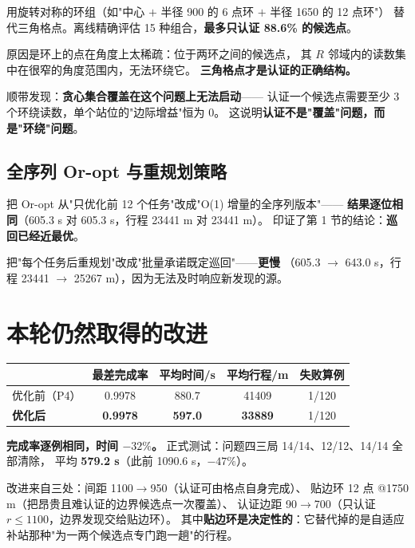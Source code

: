 用旋转对称的环组（如"中心 $+$ 半径 900 的 6 点环 $+$ 半径 1650 的 12 点环"）
替代三角格点。离线精确评估 15 种组合，\textbf{最多只认证 88.6\% 的候选点}。

原因是环上的点在角度上太稀疏：位于两环之间的候选点，
其 $R$ 邻域内的读数集中在很窄的角度范围内，无法环绕它。
\textbf{三角格点才是认证的正确结构。}

顺带发现：\textbf{贪心集合覆盖在这个问题上无法启动}——
认证一个候选点需要至少 3 个环绕读数，单个站位的"边际增益"恒为 0。
这说明\textbf{认证不是"覆盖"问题，而是"环绕"问题}。

\subsection{全序列 Or-opt 与重规划策略}

把 Or-opt 从"只优化前 12 个任务"改成"O(1) 增量的全序列版本"——
\textbf{结果逐位相同}（605.3 s 对 605.3 s，行程 23441 m 对 23441 m）。
印证了第 1 节的结论：\textbf{巡回已经近最优}。

把"每个任务后重规划"改成"批量承诺既定巡回"——\textbf{更慢}
（605.3 $\to$ 643.0 s，行程 23441 $\to$ 25267 m），因为无法及时响应新发现的源。

\section{本轮仍然取得的改进}

\begin{center}
\begin{tabular}{lcccc}
\toprule
 & 最差完成率 & 平均时间/s & 平均行程/m & 失败算例 \\ \midrule
优化前（P4） & 0.9978 & 880.7 & 41409 & 1/120 \\
\textbf{优化后} & \textbf{0.9978} & \textbf{597.0} & \textbf{33889} & 1/120 \\
\bottomrule
\end{tabular}
\end{center}

\textbf{完成率逐例相同，时间 $-32\%$。} 正式测试：问题四三局 14/14、12/12、14/14 全部清除，
平均 \textbf{579.2 s}（此前 1090.6 s，$-47\%$）。

改进来自三处：间距 1100$\to$950（认证可由格点自身完成）、
贴边环 12 点 @1750 m（把昂贵且难认证的边界候选点一次覆盖）、
认证边距 90$\to$700（只认证 $r\le1100$，边界发现交给贴边环）。
其中\textbf{贴边环是决定性的}：它替代掉的是自适应补站那种"为一两个候选点专门跑一趟"的行程。

